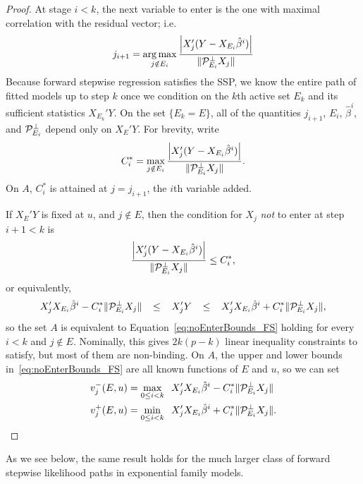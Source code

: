 \documentclass{article}
\begin{document}
\begin{proof}
  At stage $i < k$, the next variable to enter is the one with maximal correlation with the residual vector; i.e.
  \[
  j_{i+1} = \operatorname*{arg\,max}_{j \notin E_i} 
  \frac{\left| X_j ' (Y - X_{E_i}\hat\beta^i) \right|}
  {\|\mathcal{P}_{E_i}^\perp X_j\|}
  \]
  Because forward stepwise regression satisfies the SSP, we know the entire path of fitted models up to step $k$ once we condition on the $k$th active set $E_k$ and its sufficient statistics $X_{E_k}'Y$. On the set $\{E_k=E\}$, all of the quantities $j_{i+1}$, $E_i$, $\hat\beta^i$, and $\mathcal{P}_{E_i}^\perp$ depend only on $X_E'Y$. For brevity, write 
  \[
  C_i^* = \max_{j \notin E_i} 
  \frac{\left| X_j ' (Y - X_{E_i}\hat\beta^i) \right|}
  {\|\mathcal{P}_{E_i}^\perp X_j\|}.
  \]
  On $A$, $C_i^*$ is attained at $j=j_{i+1}$, the $i$th variable added.

  If $X_E'Y$ is fixed at $u$, and $j \notin E$, then the condition for 
  $X_j$ {\em not} to enter at step $i+1 < k$ is
  \[
  \frac{\left| X_j' (Y - X_{E_i}\hat\beta^i) \right|}
  {\|\mathcal{P}_{E_i}^\perp X_j\|} 
  \leq C_i^*,
  \]
  or equivalently,
  \begin{equation}\label{eq:noEnterBounds_FS}
    X_j' X_{E_i}\hat\beta^i -
    C_i^*\|\mathcal{P}_{E_{i}}^\perp X_{j}\|
    \;\;\;\leq\;\;\;
    X_j'Y
    \;\;\;\leq\;\;\;
    X_j' X_{E_i}\hat\beta^i +
    C_i^*\|\mathcal{P}_{E_{i}}^\perp X_{j}\|, 
  \end{equation}
  so the set $A$ is equivalent to 
  Equation~\eqref{eq:noEnterBounds_FS} holding
  for every $i < k$ and $j \notin E$. Nominally, this gives $2k(p-k)$
  linear inequality constraints to satisfy, but most of them are
  non-binding. On $A$, the upper and lower bounds
  in~\eqref{eq:noEnterBounds_FS}
  are all known functions of $E$ and $u$, so we can set
  \begin{align}\label{eq:vMinus_FS}
    v_j^-(E,u) &= \max_{0 \leq i < k} \;\;X_j' X_{E_i}\hat\beta^i -
    C_i^*\|\mathcal{P}_{E_{i}}^\perp X_{j}\| \\
    \label{eq:vPlus_FS}
    v_j^+(E,u) &= \min_{0 \leq i < k} \;\;X_j' X_{E_i}\hat\beta^i +
    C_i^*\|\mathcal{P}_{E_{i}}^\perp X_{j}\|.
  \end{align}  
\end{proof}

As we see below, the same result holds for the much larger class of forward stepwise likelihood paths in exponential family models.
\end{document}
